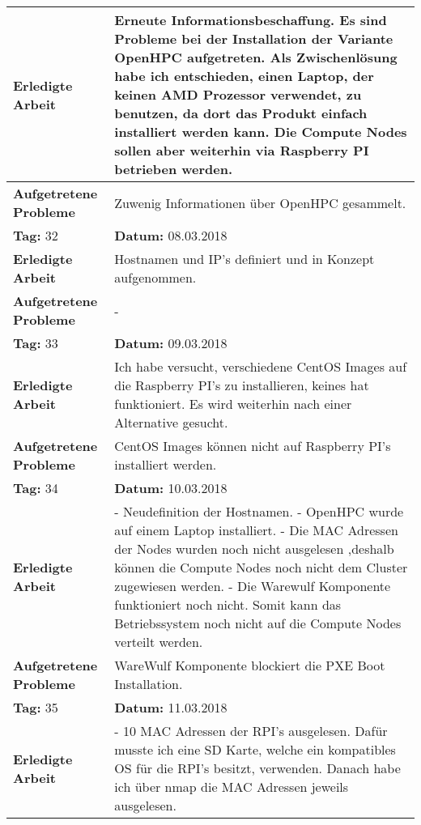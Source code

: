 \begin{longtable}{|p{5cm}|p{5cm}p{6cm}|}
\textbf{Erledigte Arbeit} & \multicolumn{2}{p{11cm}|}{Erneute Informationsbeschaffung. Es sind Probleme bei der Installation der Variante OpenHPC aufgetreten. Als Zwischenlösung habe ich entschieden, einen Laptop, der keinen AMD Prozessor verwendet, zu benutzen, da dort das Produkt einfach installiert werden kann. Die Compute Nodes sollen aber weiterhin via Raspberry PI betrieben werden.} \\ \hline
\textbf{Aufgetretene Probleme} & \multicolumn{2}{p{11cm}|}{Zuwenig Informationen über OpenHPC gesammelt.} \\ \hline
\rowcolor{heading}\textbf{Tag:} 32 & \textbf{Datum:} 08.03.2018 & \\ \hline
\textbf{Erledigte Arbeit} & \multicolumn{2}{p{11cm}|}{Hostnamen und IP's definiert und in Konzept aufgenommen.} \\ \hline
\textbf{Aufgetretene Probleme} & \multicolumn{2}{p{11cm}|}{-} \\ \hline
\rowcolor{heading}\textbf{Tag:} 33 & \textbf{Datum:} 09.03.2018 & \\ \hline
\textbf{Erledigte Arbeit} & \multicolumn{2}{p{11cm}|}{Ich habe versucht, verschiedene CentOS Images auf die Raspberry PI's zu installieren, keines hat funktioniert. Es wird weiterhin nach einer Alternative gesucht.} \\ \hline
\textbf{Aufgetretene Probleme} & \multicolumn{2}{p{11cm}|}{CentOS Images können nicht auf Raspberry PI's installiert werden.} \\ \hline
\rowcolor{heading}\textbf{Tag:} 34 & \textbf{Datum:} 10.03.2018 & \\ \hline
\textbf{Erledigte Arbeit} & \multicolumn{2}{p{11cm}|}{- Neudefinition der Hostnamen. \newline
- OpenHPC wurde auf einem Laptop installiert. \newline
- Die MAC Adressen der Nodes wurden noch nicht ausgelesen ,deshalb können die Compute Nodes noch nicht dem Cluster zugewiesen werden. \newline
- Die Warewulf Komponente funktioniert noch nicht. Somit kann das Betriebssystem noch nicht auf die Compute Nodes verteilt werden.} \\ \hline
\textbf{Aufgetretene Probleme} & \multicolumn{2}{p{11cm}|}{WareWulf Komponente blockiert die PXE Boot Installation.} \\ \hline
\rowcolor{heading}\textbf{Tag:} 35 & \textbf{Datum:} 11.03.2018 & \\ \hline
\textbf{Erledigte Arbeit} & \multicolumn{2}{p{11cm}|}{- 10 MAC Adressen der RPI's ausgelesen. Dafür musste ich eine SD Karte, welche ein kompatibles OS für die RPI's besitzt, verwenden. Danach habe ich über nmap die MAC Adressen jeweils ausgelesen.} \\ \hline

\end{longtable}
